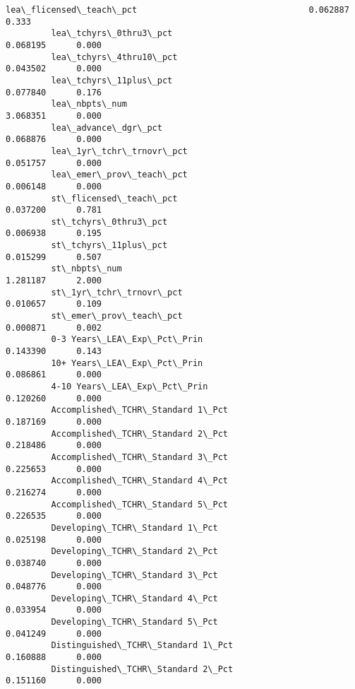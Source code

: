 \documentclass[11pt]{article}
\begin{document}
\begin{Verbatim}[commandchars=\\\{\}]
         lea\_flicensed\_teach\_pct                                  0.062887      0.333   
         lea\_tchyrs\_0thru3\_pct                                    0.068195      0.000   
         lea\_tchyrs\_4thru10\_pct                                   0.043502      0.000   
         lea\_tchyrs\_11plus\_pct                                    0.077840      0.176   
         lea\_nbpts\_num                                            3.068351      0.000   
         lea\_advance\_dgr\_pct                                      0.068876      0.000   
         lea\_1yr\_tchr\_trnovr\_pct                                  0.051757      0.000   
         lea\_emer\_prov\_teach\_pct                                  0.006148      0.000   
         st\_flicensed\_teach\_pct                                   0.037200      0.781   
         st\_tchyrs\_0thru3\_pct                                     0.006938      0.195   
         st\_tchyrs\_11plus\_pct                                     0.015299      0.507   
         st\_nbpts\_num                                             1.281187      2.000   
         st\_1yr\_tchr\_trnovr\_pct                                   0.010657      0.109   
         st\_emer\_prov\_teach\_pct                                   0.000871      0.002   
         0-3 Years\_LEA\_Exp\_Pct\_Prin                               0.143390      0.143   
         10+ Years\_LEA\_Exp\_Pct\_Prin                               0.086861      0.000   
         4-10 Years\_LEA\_Exp\_Pct\_Prin                              0.120260      0.000   
         Accomplished\_TCHR\_Standard 1\_Pct                         0.187169      0.000   
         Accomplished\_TCHR\_Standard 2\_Pct                         0.218486      0.000   
         Accomplished\_TCHR\_Standard 3\_Pct                         0.225653      0.000   
         Accomplished\_TCHR\_Standard 4\_Pct                         0.216274      0.000   
         Accomplished\_TCHR\_Standard 5\_Pct                         0.226535      0.000   
         Developing\_TCHR\_Standard 1\_Pct                           0.025198      0.000   
         Developing\_TCHR\_Standard 2\_Pct                           0.038740      0.000   
         Developing\_TCHR\_Standard 3\_Pct                           0.048776      0.000   
         Developing\_TCHR\_Standard 4\_Pct                           0.033954      0.000   
         Developing\_TCHR\_Standard 5\_Pct                           0.041249      0.000   
         Distinguished\_TCHR\_Standard 1\_Pct                        0.160888      0.000   
         Distinguished\_TCHR\_Standard 2\_Pct                        0.151160      0.000   

\end{Verbatim}
\end{document}
